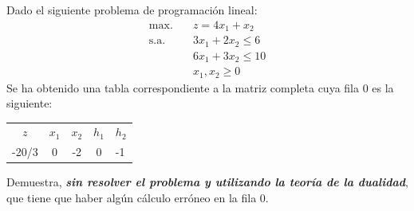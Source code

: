 Dado el siguiente problema de programación lineal:
\begin{align*}
\text{max.} \quad & z = 4x_1 + x_2 \\
\text{s.a.} \quad & 3x_1 + 2x_2 \leq 6 \\
                 & 6x_1 + 3x_2 \leq 10 \\
                 & x_1, x_2 \geq 0
\end{align*}
Se ha obtenido una tabla correspondiente a la matriz completa cuya fila 0 es la siguiente:

\begin{table}[h]
\begin{center}
\begin{tabular}{ccccc}
$z$                         & $x_1$ & $x_2$ & $h_1$ & $h_2$                   \\
\multicolumn{1}{|l|}{-20/3} & 0     & -2    & 0     & \multicolumn{1}{l|}{-1} \\ \hline
\end{tabular}
\end{center}
\end{table}
    

Demuestra, \textbf{\textit{sin resolver el problema y utilizando la teoría de la dualidad}}, que tiene que haber algún cálculo erróneo en la fila 0.



